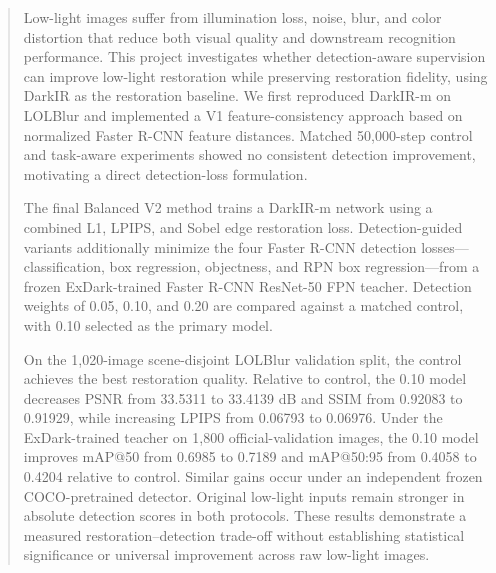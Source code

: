 \begin{abstract}
Low-light images suffer from illumination loss, noise, blur, and color
distortion that reduce both visual quality and downstream recognition
performance. This project investigates whether detection-aware supervision
can improve low-light restoration while preserving restoration fidelity,
using DarkIR as the restoration baseline. We first reproduced DarkIR-m on
LOLBlur and implemented a V1 feature-consistency approach based on normalized
Faster R-CNN feature distances. Matched 50,000-step control and task-aware
experiments showed no consistent detection improvement, motivating a direct
detection-loss formulation.

The final Balanced V2 method trains a DarkIR-m network using a combined L1,
LPIPS, and Sobel edge restoration loss. Detection-guided variants additionally
minimize the four Faster R-CNN detection losses---classification, box
regression, objectness, and RPN box regression---from a frozen
ExDark-trained Faster R-CNN ResNet-50 FPN teacher. Detection weights of
0.05, 0.10, and 0.20 are compared against a matched control, with 0.10
selected as the primary model.

On the 1,020-image scene-disjoint LOLBlur validation split, the control
achieves the best restoration quality. Relative to control, the 0.10 model
decreases PSNR from 33.5311 to 33.4139 dB and SSIM from 0.92083 to 0.91929,
while increasing LPIPS from 0.06793 to 0.06976. Under the ExDark-trained
teacher on 1,800 official-validation images, the 0.10 model improves
mAP@50 from 0.6985 to 0.7189 and mAP@50:95 from 0.4058 to 0.4204 relative
to control. Similar gains occur under an independent frozen
COCO-pretrained detector. Original low-light inputs remain stronger in
absolute detection scores in both protocols. These results demonstrate a
measured restoration--detection trade-off without establishing statistical
significance or universal improvement across raw low-light images.
\end{abstract}